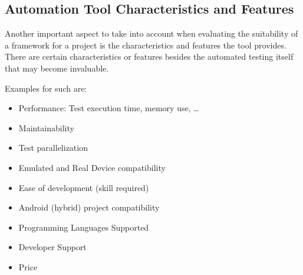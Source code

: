 \subsection {Automation Tool Characteristics and Features}

Another important aspect to take into account when evaluating the suitability of a framework for a project is the characteristics and features the tool provides. There are certain characteristics or features besides the automated testing itself that may become invaluable. 

Examples for such are: 
	\begin{itemize}
  		\item Performance: Test execution time, memory use, …
		\item Maintainability
		\item Test parallelization
		\item Emulated and Real Device compatibility
		\item Ease of development (skill required)
		\item Android (hybrid) project compatibility
		\item Programming Languages Supported
		\item Developer Support
		\item Price
	\end{itemize}


